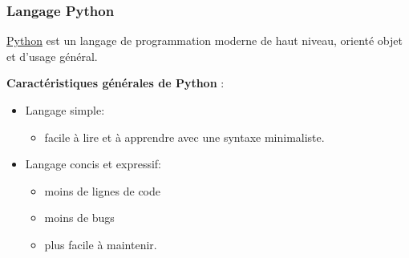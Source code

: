 \documentclass{beamer}
\begin{document}
\begin{frame}
\frametitle{Langage Python}


\href{{http://www.python.org/}}{Python} est un langage de programmation moderne de haut niveau, orienté objet et d'usage général.

\textbf{Caractéristiques générales de Python} :

\begin{itemize}
\item Langage simple:
\begin{itemize}

  \item facile à lire et à apprendre avec une syntaxe minimaliste.

\end{itemize}

\noindent
\item Langage concis et expressif:
\begin{itemize}

  \item moins de lignes de code

  \item moins de bugs

  \item plus facile à maintenir.
\end{itemize}

\noindent
\end{itemize}

\noindent

\end{frame}
\end{document}
